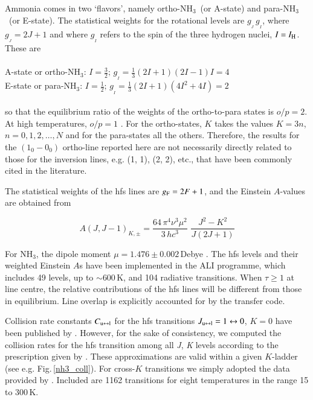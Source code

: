 \documentclass{aa}
\newcommand{\ammonia}{{\rm NH}$_3$}
\begin{document}
Ammonia comes in two `flavors', namely ortho-\ammonia\ (or A-state)  and para-\ammonia\ (or E-state). The statistical weights for the rotational levels are $g_{_J}\,g_{_I}$, where $g_{_J}=2J+1$ and where $g_{_I}$ refers to the spin of the three hydrogen nuclei, $I=I_{\rm H}$. These are \citep{townes1955} \\
\\
A-state or ortho-\ammonia: $I=\frac {3}{2}; \,g_{_I} = \frac {1}{3} (2I + 1)(2I - 1)I = 4$ \\
E-state or para-\ammonia: $I=\frac {1}{2};\,g_{_I} = \frac {1}{3} (2I + 1)(4I^2 + 4I) = 2$\\
\\
so that the equilibrium ratio of the weights of the ortho-to-para states is $o/p=2$. At high temperatures, $o/p=1$ \citep{faure2013}. For the ortho-states, $K$ takes the values $K=3n$, $n=0,1,2,\dots,N$ and for the para-states all the others. Therefore, the results for the $(1_0-0_0)$ ortho-line reported here are not necessarily directly related to those for the inversion lines, e.g. (1, 1), (2, 2), etc., that have been commonly cited in the literature. 

The statistical weights of the hfs lines are $g_{\rm F}=2 F + 1$, and the Einstein $A$-values are obtained from 
                                                       
\begin{equation}
A(J, J-1)_{K, \pm} = \frac {64\,\pi^4 \nu^3 \mu^2}{3\,h c^3 } \,\,\frac {J^2-K^2}{J(2J+1)}
\end{equation}

For NH$_3$, the dipole moment $\mu = 1.476 \pm 0.002$\,Debye \citep{poynter1975}. The hfs levels and their weighted Einstein $A$s have been implemented in the ALI programme, which includes 49 levels, up to $\sim 600$\,K, and 104 radiative transitions. When $\tau \ge 1$ at line centre, the relative contributions of the hfs lines will be different from those in equilibrium. Line overlap is explicitly accounted for by the transfer code. 


Collision rate constants $C_{\rm u \leftrightarrow l}$ for the hfs transitions $J_{\rm u \leftrightarrow l} =1 \leftrightarrow 0$, $K=0$ have been published by \citet{chen1998}. However, for the sake of consistency, we computed the collision rates for the hfs transition among all {\it J},  {\it K} levels according to the prescription given by \citet{alexander1985}. These approximations are valid within a given $K$-ladder (see e.g. Fig.\,\ref{nh3_coll}). For cross-$K$ transitions we simply adopted the data provided by \citet{danby1988}. Included are 1162  transitions for eight temperatures in the range 15 to 300\,K.
\end{document}

